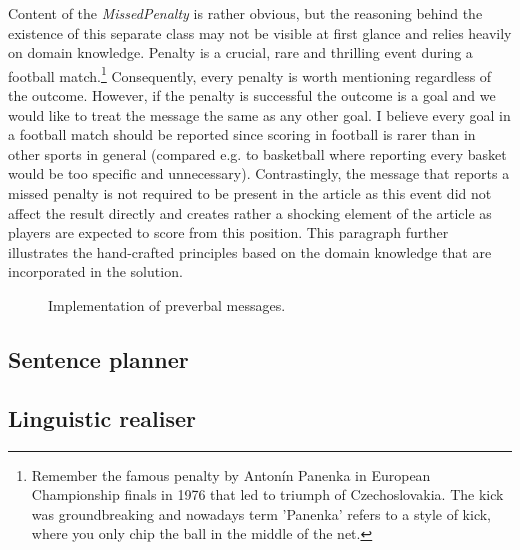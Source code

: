 Content of the \textit{MissedPenalty} is rather obvious, but the reasoning behind the existence of this separate class may not be visible at first glance and relies heavily on domain knowledge. Penalty is a crucial, rare and thrilling event during a football match.\footnote{Remember the famous penalty by Antonín Panenka in European Championship finals in 1976 that led to triumph of Czechoslovakia. The kick was groundbreaking and nowadays term 'Panenka' refers to a style of kick, where you only chip the ball in the middle of the net.} Consequently, every penalty is worth mentioning regardless of the outcome. However, if the penalty is successful the outcome is a goal and we would like to treat the message the same as any other goal. I believe every goal in a football match should be reported since scoring in football is rarer than in other sports in general (compared e.g. to basketball where reporting every basket would be too specific and unnecessary). Contrastingly, the message that reports a missed penalty is not required to be present in the article as this event did not affect the result directly and creates rather a shocking element of the article as players are expected to score from this position. This paragraph further illustrates the hand-crafted principles based on the domain knowledge that are incorporated in the solution.

\begin{figure}[h]
	\caption{Implementation of preverbal messages.}
	\label{fig:message}
\end{figure} 

\subsection{Sentence planner}

\subsection{Linguistic realiser}

